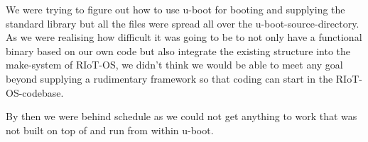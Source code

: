 We were trying to figure out how to use u-boot for booting and supplying the standard
library but all the files were spread all over the u-boot-source-directory.
As we were realising how difficult it was going to be to not only have a functional
binary based on our own code but also integrate the existing structure into the
make-system of RIoT-OS, we didn't think we would be able to meet any goal beyond
supplying a rudimentary framework so that coding can start in the RIoT-OS-codebase.

By then we were behind schedule as we could not get anything to work that was not built
on top of and run from within u-boot.
